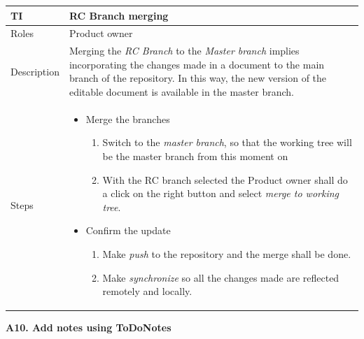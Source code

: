 \documentclass{template/openetcs_article}
\begin{document}
\begin{flushleft}
\tablefirsthead{}
\tablehead{}
\tabletail{}
\tablelasttail{}
\begin{supertabular}{|m{2cm}|m{13cm}|}
\hline
{}
TI & 
RC Branch merging
\\\hline
Roles &
Product owner
\\\hline
Description &
Merging the {\it RC Branch} to the {\it Master branch} implies incorporating the changes made in a document to the main branch of the repository. In this way, the new version of the editable document is available in the master branch.
\\\hline
Steps &
\begin{itemize}
\item Merge the branches 
\begin{enumerate}
\item Switch to the {\it master branch}, so that the working tree will be the master branch from this moment on
\item With the RC branch selected the Product owner shall do a click on the right button and select {\it merge to working tree}.
\end{enumerate}
\item Confirm the update
\begin{enumerate}
\item Make {\it push} to the repository and the merge shall be done.
\item Make {\it synchronize} so all the changes made are reflected remotely and locally.
\end{enumerate}
\end{itemize}
\\\hline
\end{supertabular}
\end{flushleft}


\textbf{A10. Add notes using ToDoNotes}
\end{document}
